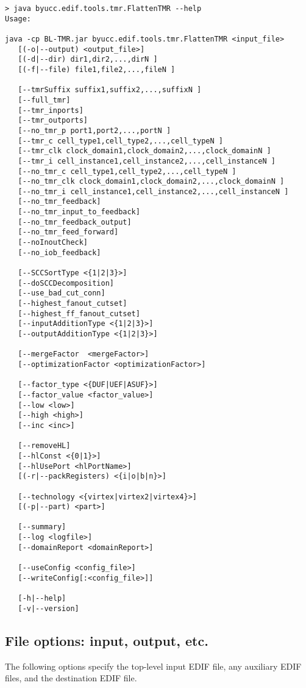 \documentclass[english]{article}
\begin{document}
\begin{verbatim}
> java byucc.edif.tools.tmr.FlattenTMR --help
Usage:

java -cp BL-TMR.jar byucc.edif.tools.tmr.FlattenTMR <input_file>
   [(-o|--output) <output_file>]
   [(-d|--dir) dir1,dir2,...,dirN ]
   [(-f|--file) file1,file2,...,fileN ]

   [--tmrSuffix suffix1,suffix2,...,suffixN ]
   [--full_tmr]
   [--tmr_inports]
   [--tmr_outports]
   [--no_tmr_p port1,port2,...,portN ]
   [--tmr_c cell_type1,cell_type2,...,cell_typeN ]
   [--tmr_clk clock_domain1,clock_domain2,...,clock_domainN ]
   [--tmr_i cell_instance1,cell_instance2,...,cell_instanceN ]
   [--no_tmr_c cell_type1,cell_type2,...,cell_typeN ]
   [--no_tmr_clk clock_domain1,clock_domain2,...,clock_domainN ]
   [--no_tmr_i cell_instance1,cell_instance2,...,cell_instanceN ]
   [--no_tmr_feedback]
   [--no_tmr_input_to_feedback]
   [--no_tmr_feedback_output]
   [--no_tmr_feed_forward]
   [--noInoutCheck]
   [--no_iob_feedback]

   [--SCCSortType <{1|2|3}>]
   [--doSCCDecomposition]
   [--use_bad_cut_conn]
   [--highest_fanout_cutset]
   [--highest_ff_fanout_cutset]
   [--inputAdditionType <{1|2|3}>]
   [--outputAdditionType <{1|2|3}>]

   [--mergeFactor  <mergeFactor>]
   [--optimizationFactor <optimizationFactor>]

   [--factor_type <{DUF|UEF|ASUF}>]
   [--factor_value <factor_value>]
   [--low <low>]
   [--high <high>]
   [--inc <inc>]

   [--removeHL]
   [--hlConst <{0|1}>]
   [--hlUsePort <hlPortName>]
   [(-r|--packRegisters) <{i|o|b|n}>]

   [--technology <{virtex|virtex2|virtex4}>]
   [(-p|--part) <part>]

   [--summary]
   [--log <logfile>]
   [--domainReport <domainReport>]

   [--useConfig <config_file>]
   [--writeConfig[:<config_file>]]

   [-h|--help]
   [-v|--version]
\end{verbatim}

\subsection{File options: input, output, etc.}
The following options specify the top-level input EDIF file, any auxiliary EDIF
files, and the destination EDIF file.
\end{document}
